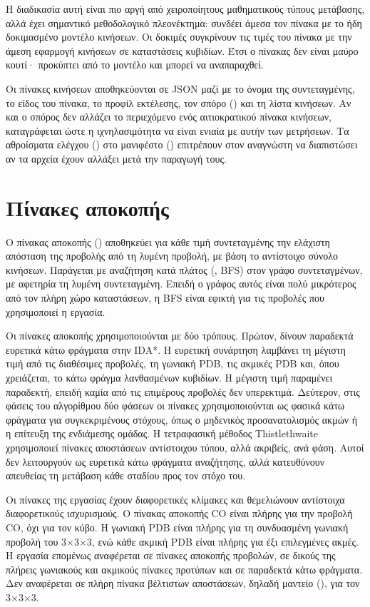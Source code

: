 Η διαδικασία αυτή είναι πιο αργή από χειροποίητους μαθηματικούς τύπους μετάβασης, αλλά έχει σημαντικό μεθοδολογικό πλεονέκτημα: συνδέει άμεσα τον πίνακα με το ήδη δοκιμασμένο μοντέλο κινήσεων. Οι δοκιμές συγκρίνουν τις τιμές του πίνακα με την άμεση εφαρμογή κινήσεων σε καταστάσεις κυβιδίων. Έτσι ο πίνακας δεν είναι μαύρο κουτί· προκύπτει από το μοντέλο και μπορεί να αναπαραχθεί.

Οι πίνακες κινήσεων αποθηκεύονται σε JSON μαζί με το όνομα της συντεταγμένης, το είδος του πίνακα, το προφίλ εκτέλεσης, τον σπόρο () και τη λίστα κινήσεων. Αν και ο σπόρος δεν αλλάζει το περιεχόμενο ενός αιτιοκρατικού πίνακα κινήσεων, καταγράφεται ώστε η ιχνηλασιμότητα να είναι ενιαία με αυτήν των μετρήσεων. Τα αθροίσματα ελέγχου () στο μανιφέστο () επιτρέπουν στον αναγνώστη να διαπιστώσει αν τα αρχεία έχουν αλλάξει μετά την παραγωγή τους.

\section{Πίνακες αποκοπής}
\label{sec:model-pruning-tables}
Ο πίνακας αποκοπής () αποθηκεύει για κάθε τιμή συντεταγμένης την ελάχιστη απόσταση της προβολής από τη λυμένη προβολή, με βάση το αντίστοιχο σύνολο κινήσεων. Παράγεται με αναζήτηση κατά πλάτος (, BFS) στον γράφο συντεταγμένων, με αφετηρία τη λυμένη συντεταγμένη. Επειδή ο γράφος αυτός είναι πολύ μικρότερος από τον πλήρη χώρο καταστάσεων, η BFS είναι εφικτή για τις προβολές που χρησιμοποιεί η εργασία.

Οι πίνακες αποκοπής χρησιμοποιούνται με δύο τρόπους. Πρώτον, δίνουν παραδεκτά ευρετικά κάτω φράγματα στην IDA*. Η ευρετική συνάρτηση λαμβάνει τη μέγιστη τιμή από τις διαθέσιμες προβολές, τη γωνιακή PDB, τις ακμικές PDB και, όπου χρειάζεται, το κάτω φράγμα λανθασμένων κυβιδίων. Η μέγιστη τιμή παραμένει παραδεκτή, επειδή καμία από τις επιμέρους προβολές δεν υπερεκτιμά. Δεύτερον, στις φάσεις του αλγορίθμου δύο φάσεων οι πίνακες χρησιμοποιούνται ως φασικά κάτω φράγματα για συγκεκριμένους στόχους, όπως ο μηδενικός προσανατολισμός ακμών ή η επίτευξη της ενδιάμεσης ομάδας. Η τετραφασική μέθοδος Thistlethwaite χρησιμοποιεί πίνακες αποστάσεων αντίστοιχου τύπου, αλλά ακριβείς, ανά φάση. Αυτοί δεν λειτουργούν ως ευρετικά κάτω φράγματα αναζήτησης, αλλά κατευθύνουν απευθείας τη μετάβαση κάθε σταδίου προς τον στόχο του.

Οι πίνακες της εργασίας έχουν διαφορετικές κλίμακες και θεμελιώνουν αντίστοιχα διαφορετικούς ισχυρισμούς. Ο πίνακας αποκοπής CO είναι πλήρης για την προβολή CO, όχι για τον κύβο. Η γωνιακή PDB είναι πλήρης για τη συνδυασμένη γωνιακή προβολή του 3×3×3, ενώ κάθε ακμική PDB είναι πλήρης για έξι επιλεγμένες ακμές. Η εργασία επομένως αναφέρεται σε πίνακες αποκοπής προβολών, σε δικούς της πλήρεις γωνιακούς και ακμικούς πίνακες προτύπων και σε παραδεκτά κάτω φράγματα. Δεν αναφέρεται σε πλήρη πίνακα βέλτιστων αποστάσεων, δηλαδή μαντείο (), για τον 3×3×3.

